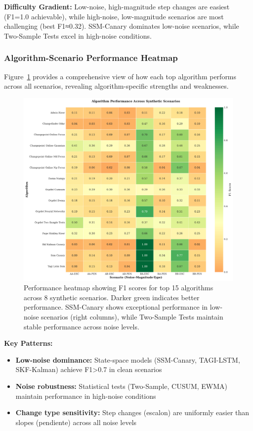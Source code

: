 \documentclass[journal,article,submit,pdftex,moreauthors]{Definitions/mdpi}
\begin{document}
\textbf{Difficulty Gradient:} Low-noise, high-magnitude step changes are easiest (F1=1.0 achievable), while high-noise, low-magnitude scenarios are most challenging (best F1≈0.32). SSM-Canary dominates low-noise scenarios, while Two-Sample Tests excel in high-noise conditions.


\subsubsection{Algorithm-Scenario Performance Heatmap}

Figure~\ref{fig:scenario_heatmap} provides a comprehensive view of how each top algorithm performs across all scenarios, revealing algorithm-specific strengths and weaknesses.

\begin{figure}[ht]
\centering
\includegraphics[width=\textwidth]{figures/fig_scenario_heatmap.pdf}
\caption{Performance heatmap showing F1 scores for top 15 algorithms across 8 synthetic scenarios. Darker green indicates better performance. SSM-Canary shows exceptional performance in low-noise scenarios (right columns), while Two-Sample Tests maintain stable performance across noise levels.}
\label{fig:scenario_heatmap}
\end{figure}

\textbf{Key Patterns:} 
\begin{itemize}
\item \textbf{Low-noise dominance:} State-space models (SSM-Canary, TAGI-LSTM, SKF-Kalman) achieve F1>0.7 in clean scenarios
\item \textbf{Noise robustness:} Statistical tests (Two-Sample, CUSUM, EWMA) maintain performance in high-noise conditions
\item \textbf{Change type sensitivity:} Step changes (escalon) are uniformly easier than slopes (pendiente) across all noise levels
\end{itemize}
\end{document}
